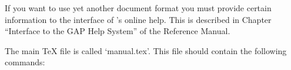 If you want to use yet another document format you must  provide  certain
information to the interface of {\GAP}'s online help. This  is  described
in Chapter ``Interface to the GAP Help System'' of the
{\GAP} Reference Manual.


\indextt{\\BeginningOfBook}\indextt{\\UseReferences}
\indextt{\\UseGapDocReferences}
\indextt{\\TitlePage}\indextt{\\Colophon}\indextt{\\TableOfContents}
\indextt{\\OneColumnTableOfContents}
\indextt{\\FrontMatter}\indextt{\\Chapters}\indextt{\\Appendices}
\indextt{\\Bibliography}\indextt{\\Index}\indextt{\\EndOfBook}
\indextt{\\Package}\indextt{\\package}
The main {\TeX} file is called `manual.tex'.
This file should contain the following commands:


